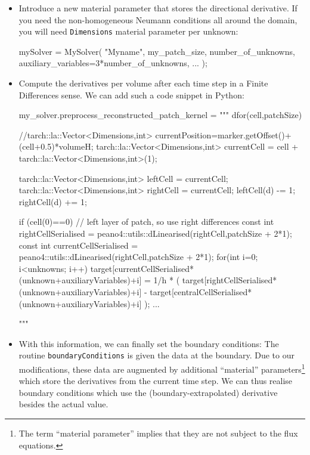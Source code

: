 \begin{itemize}
  \item Introduce a new material parameter that stores the directional
  derivative. If you need the non-homogeneous Neumann conditions all around the
  domain, you will need \texttt{Dimensions} material parameter per unknown:
  \begin{code}
mySolver = MySolver( "Myname", my_patch_size, number_of_unknowns,
  auxiliary_variables=3*number_of_unknowns, ... );
  \end{code}
  \item Compute the derivatives per volume after each time step in a Finite
  Differences sense. We can add such a code snippet in Python:
  \begin{code}
my_solver.preprocess_reconstructed_patch_kernel = """
  dfor(cell,patchSize) {
    //tarch::la::Vector<Dimensions,int> currentPosition=marker.getOffset()+(cell+0.5)*volumeH;
    tarch::la::Vector<Dimensions,int> currentCell = cell + tarch::la::Vector<Dimensions,int>(1);

    tarch::la::Vector<Dimensions,int> leftCell  = currentCell;
    tarch::la::Vector<Dimensions,int> rightCell = currentCell;
    leftCell(d)  -= 1;
    rightCell(d) += 1;

    if (cell(0)==0) { // left layer of patch, so use right differences
      const int rightCellSerialised  =
        peano4::utils::dLinearised(rightCell,patchSize + 2*1); 
      const int currentCellSerialised = 
        peano4::utils::dLinearised(rightCell,patchSize + 2*1); 
      for(int i=0; i<unknowns; i++) { 
        target[currentCellSerialised*(unknown+auxiliaryVariables)+i] = 
         1/h * (
           target[rightCellSerialised*(unknown+auxiliaryVariables)+i] -
           target[centralCellSerialised*(unknown+auxiliaryVariables)+i]
         );
  ...
      }}}"""
\end{code}
  \item With this information, we can finally set the boundary conditions:
  The routine \texttt{boundaryConditions} is given the data at the boundary.
  Due to our modifications, these data are augmented by additional ``material''
  parameters\footnote{The term ``material parameter'' implies that they are not
  subject to the flux equations.} which store the derivatives from the current
  time step.
  We can thus realise boundary conditions which use the (boundary-extrapolated)
  derivative besides the actual value.
\end{itemize}



